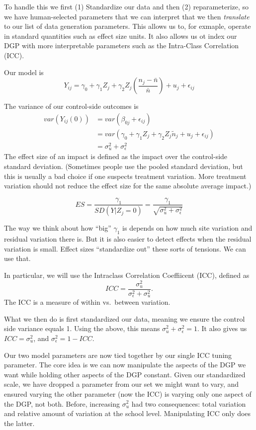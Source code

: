\documentclass[
]{book}
\begin{document}
To handle this we first (1) Standardize our data and then (2) reparameterize, so we have human-selected parameters that we can interpret that we then \emph{translate} to our list of data generation parameters.
This allows us to, for exmaple, operate in standard quantities such as effect size units.
It also allows us ot index our DGP with more interpretable parameters such as the Intra-Class Correlation (ICC).

Our model is
\[ Y_{ij} = \gamma_{0} + \gamma_{1} Z_j + \gamma_2 Z_j \left(\frac{n_j - \bar{n}}{\bar{n}} \right)  + u_j + \epsilon_{ij}  \]

The variance of our control-side outcomes is
\[ 
\begin{aligned}
var( Y_{ij}(0) ) &= var( \beta_{0j} + \epsilon_{ij} ) \\
 &= var( \gamma_{0} + \gamma_{1} Z_j + \gamma_{2}Z_j \tilde{n}_j + u_j + \epsilon_{ij} ) \\
&= \sigma^2_u + \sigma^2_\epsilon
\end{aligned}
\]
The effect size of an impact is defined as the impact over the control-side standard deviation.
(Sometimes people use the pooled standard deviation, but this is usually a bad choice if one suspects treatment variation. More treatment variation should not reduce the effect size for the same absolute average impact.)

\[ ES = \frac{\gamma_1}{SD( Y | Z_j = 0 )} = \frac{\gamma_1}{\sqrt{ \sigma^2_u + \sigma^2_\epsilon } } \]

The way we think about how ``big'' \(\gamma_1\) is depends on how much site variation and residual variation there is.
But it is also easier to detect effects when the residual variation is small.
Effect sizes ``standardize out'' these sorts of tensions. We can use that.

In particular, we will use the Intraclass Correlation Coeffiicent (ICC), defined as
\[ ICC = \frac{ \sigma^2_u }{ \sigma^2_\epsilon + \sigma^2_u } . \]
The ICC is a measure of within vs.~between variation.

What we then do is first standardized our data, meaning we ensure the control side variance equals 1.
Using the above, this means \(\sigma^2_u + \sigma^2_\epsilon = 1\).
It also gives us \(ICC = \sigma^2_u\), and \(\sigma^2_\epsilon = 1 - ICC\).

Our two model parameters are now tied together by our single ICC tuning parameter.
The core idea is we can now manipulate the aspects of the DGP we want while holding other aspects of the DGP constant.
Given our standardized scale, we have dropped a parameter from our set we might want to vary, and ensured varying the other parameter (now the ICC) is varying only one aspect of the DGP, not both.
Before, increasing \(\sigma^2_u\) had two consequences: total variation and relative amount of variation at the school level.
Manipulating ICC only does the latter.
\end{document}
